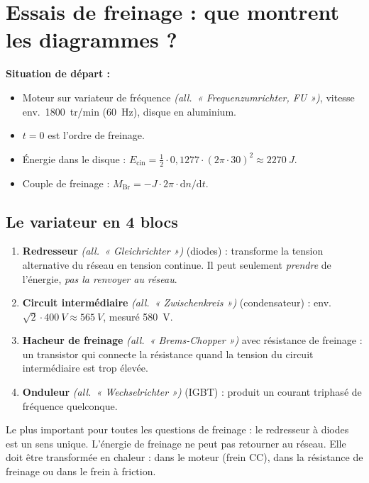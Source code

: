 \documentclass[11pt,a4paper]{article}
\newcommand{\de}[1]{\textit{(all.\ « #1 »)}}
\begin{document}
\section{Essais de freinage : que montrent les diagrammes ?}
\textbf{Situation de départ :}
\begin{itemize}
\item Moteur sur variateur de fréquence \de{Frequenzumrichter, FU}, vitesse env.\
      \SI{1800}{tr/min} (\SI{60}{Hz}), disque en aluminium.
\item $t=0$ est l'ordre de freinage.
\item Énergie dans le disque : $E_\mathrm{cin} = \frac12\cdot0{,}1277\cdot(2\pi\cdot30)^2\approx\SI{2270}{J}$.
\item Couple de freinage : $M_\mathrm{Br} = -J\cdot2\pi\cdot\mathrm dn/\mathrm dt$.
\end{itemize}

\subsection{Le variateur en 4 blocs}
\begin{enumerate}
\item \textbf{Redresseur} \de{Gleichrichter} (diodes) : transforme la tension alternative du réseau
  en tension continue. Il peut seulement \emph{prendre} de l'énergie, \emph{pas la renvoyer au réseau}.
\item \textbf{Circuit intermédiaire} \de{Zwischenkreis} (condensateur) :
  env.\ $\sqrt2\cdot\SI{400}{V}\approx\SI{565}{V}$, mesuré \SI{580}{V}.
\item \textbf{Hacheur de freinage} \de{Brems-Chopper} avec résistance de freinage : un transistor
  qui connecte la résistance quand la tension du circuit intermédiaire est trop élevée.
\item \textbf{Onduleur} \de{Wechselrichter} (IGBT) : produit un courant triphasé de fréquence quelconque.
\end{enumerate}
\begin{merke}
Le plus important pour toutes les questions de freinage : le redresseur à diodes est un sens
unique. L'énergie de freinage ne peut pas retourner au réseau. Elle doit être transformée en
chaleur : dans le moteur (frein CC), dans la résistance de freinage ou dans le frein à friction.
\end{merke}
\end{document}
